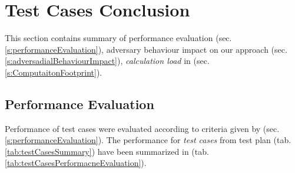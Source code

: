 \cleardoublepage
\section{Test Cases Conclusion}\label{s:testCasesConclusion}
\noindent This section contains summary of performance evaluation (sec. \ref{s:performanceEvaluation}), adversary behaviour impact on our approach (sec. \ref{s:adversadialBehaviourImpact}), \emph{calculation load} in (sec. \ref{s:ComputaitonFootprint}).

\subsection{Performance Evaluation}\label{s:performanceEvaluationTable}
\noindent Performance of test cases were evaluated according to criteria given by (sec. \ref{s:performanceEvaluation}). The performance for \emph{test cases} from test plan (tab. \ref{tab:testCasesSummary}) have been summarized in (tab. \ref{tab:testCasesPerformacneEvaluation}).

